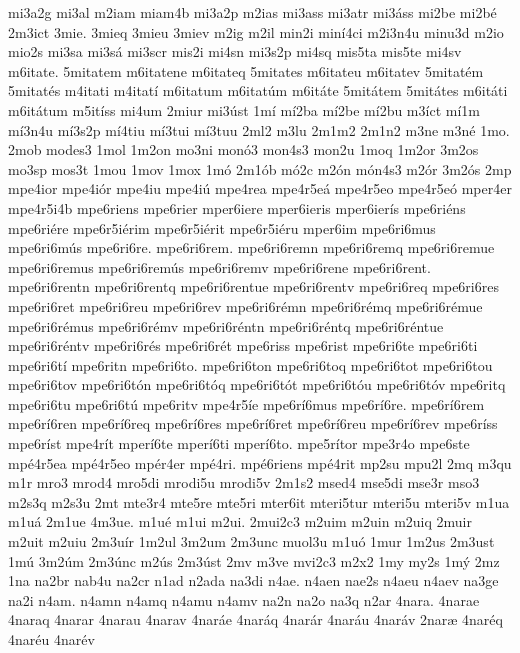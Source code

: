 {mi3a2g
mi3al
m2iam
miam4b
mi3a2p
m2ias
mi3ass
mi3atr
mi3^^e1ss
mi2be
mi2b^^e9
2m3ict
3mie.
3mieq
3mieu
3miev
m2ig
m2il
min2i
min^^ed4ci
m2i3n4u
minu3d
m2io
mio2s
mi3sa
mi3s^^e1
mi3scr
mis2i
mi4sn
mi3s2p
mi4sq
mis5ta
mis5te
mi4sv
m6itate.
5mitatem
m6itatene
m6itateq
5mitates
m6itateu
m6itatev
5mitat^^e9m
5mitat^^e9s
m4itati
m4itat^^ed
m6itatum
m6itat^^fam
m6it^^e1te
5mit^^e1tem
5mit^^e1tes
m6it^^e1ti
m6it^^e1tum
m5it^^edss
mi4um
2miur
mi3^^fast
1m^^ed
m^^ed2ba
m^^ed2be
m^^ed2bu
m3^^edct
m^^ed1m
m^^ed3n4u
m^^ed3s2p
m^^ed4tiu
m^^ed3tui
m^^ed3tuu
2ml2
m3lu
2m1m2
2m1n2
m3ne
m3n^^e9
1mo.
2mob
modes3
1mol
1m2on
mo3ni
mon^^f33
mon4s3
mon2u
1moq
1m2or
3m2os
mo3sp
mos3t
1mou
1mov
1mox
1m^^f3
2m1^^f3b
m^^f32c
m2^^f3n
m^^f3n4s3
m2^^f3r
3m2^^f3s
2mp
mpe4ior
mpe4i^^f3r
mpe4iu
mpe4i^^fa
mpe4rea
mpe4r5e^^e1
mpe4r5eo
mpe4r5e^^f3
mper4er
mpe4r5i4b
mpe6riens
mpe6rier
mper6iere
mper6ieris
mper6ier^^eds
mpe6ri^^e9ns
mpe6ri^^e9re
mpe6r5i^^e9rim
mpe6r5i^^e9rit
mpe6r5i^^e9ru
mper6im
mpe6ri6mus
mpe6ri6m^^fas
mpe6ri6re.
mpe6ri6rem.
mpe6ri6remn
mpe6ri6remq
mpe6ri6remue
mpe6ri6remus
mpe6ri6rem^^fas
mpe6ri6remv
mpe6ri6rene
mpe6ri6rent.
mpe6ri6rentn
mpe6ri6rentq
mpe6ri6rentue
mpe6ri6rentv
mpe6ri6req
mpe6ri6res
mpe6ri6ret
mpe6ri6reu
mpe6ri6rev
mpe6ri6r^^e9mn
mpe6ri6r^^e9mq
mpe6ri6r^^e9mue
mpe6ri6r^^e9mus
mpe6ri6r^^e9mv
mpe6ri6r^^e9ntn
mpe6ri6r^^e9ntq
mpe6ri6r^^e9ntue
mpe6ri6r^^e9ntv
mpe6ri6r^^e9s
mpe6ri6r^^e9t
mpe6riss
mpe6rist
mpe6ri6te
mpe6ri6ti
mpe6ri6t^^ed
mpe6ritn
mpe6ri6to.
mpe6ri6ton
mpe6ri6toq
mpe6ri6tot
mpe6ri6tou
mpe6ri6tov
mpe6ri6t^^f3n
mpe6ri6t^^f3q
mpe6ri6t^^f3t
mpe6ri6t^^f3u
mpe6ri6t^^f3v
mpe6ritq
mpe6ri6tu
mpe6ri6t^^fa
mpe6ritv
mpe4r5^^ede
mpe6r^^ed6mus
mpe6r^^ed6re.
mpe6r^^ed6rem
mpe6r^^ed6ren
mpe6r^^ed6req
mpe6r^^ed6res
mpe6r^^ed6ret
mpe6r^^ed6reu
mpe6r^^ed6rev
mpe6r^^edss
mpe6r^^edst
mpe4r^^edt
mper^^ed6te
mper^^ed6ti
mper^^ed6to.
mpe5r^^edtor
mpe3r4o
mpe6ste
mp^^e94r5ea
mp^^e94r5eo
mp^^e9r4er
mp^^e94ri.
mp^^e96riens
mp^^e94rit
mp2su
mpu2l
2mq
m3qu
m1r
mro3
mrod4
mro5di
mrodi5u
mrodi5v
2m1s2
msed4
mse5di
mse3r
mso3
m2s3q
m2s3u
2mt
mte3r4
mte5re
mte5ri
mter6it
mteri5tur
mteri5u
mteri5v
m1ua
m1u^^e1
2m1ue
4m3ue.
m1u^^e9
m1ui
m2ui.
2mui2c3
m2uim
m2uin
m2uiq
2muir
m2uit
m2uiu
2m3u^^edr
1m2ul
3m2um
2m3unc
muol3u
m1u^^f3
1mur
1m2us
2m3ust
1m^^fa
3m2^^fam
2m3^^fanc
m2^^fas
2m3^^fast
2mv
m3ve
mvi2c3
m2x2
1my
my2s
1m^^fd
2mz
1na
na2br
nab4u
na2cr
n1ad
n2ada
na3di
n4ae.
n4aen
nae2s
n4aeu
n4aev
na3ge
na2i
n4am.
n4amn
n4amq
n4amu
n4amv
na2n
na2o
na3q
n2ar
4nara.
4narae
4naraq
4narar
4narau
4narav
4nar^^e1e
4nar^^e1q
4nar^^e1r
4nar^^e1u
4nar^^e1v
2nar^^e6
4nar^^e9q
4nar^^e9u
4nar^^e9v
}
